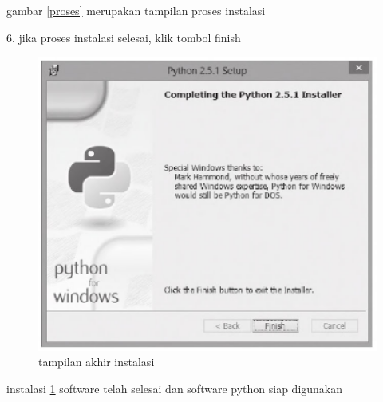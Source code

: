 	gambar \ref {proses} merupakan tampilan proses instalasi

	6. jika proses instalasi selesai, klik tombol finish
	
	\begin{figure}[ht]
	\centerline{\includegraphics[width=1\textwidth]{figures/selesai.PNG}}
	\caption{tampilan akhir instalasi}
	\label{selesai}
	\end{figure}
	
	instalasi \ref {selesai} software telah selesai dan software python siap digunakan

